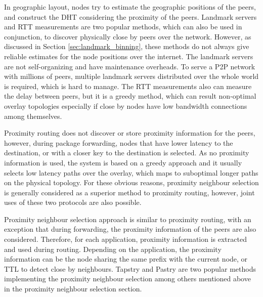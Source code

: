 In geographic layout, nodes try to estimate the geographic positions of the
peers, and construct the DHT considering the proximity of the peers. Landmark
servers and RTT measurements are two popular methods, which can also be used in
conjunction, to discover physically close by peers over the network. However, as
discussed in Section \ref{sec:landmark_binning}, these methods do not always
give reliable estimates for the node positions over the internet. The landmark
servers are not self-organizing and have maintenance overheads. To serve a
P2P network with millions of peers, multiple landmark servers
distributed over the whole world is required, which is hard to manage. The RTT
measurements also can measure the delay between peers, but it is a greedy method,
which can result non-optimal overlay topologies especially if close by nodes
have low bandwidth connections among themselves.

Proximity routing does not discover or store proximity information for the
peers, however, during package forwarding, nodes that have lower latency to the
destination, or with a closer key to the destination is selected. As no
proximity information is used, the system is based on a greedy approach and it
usually selects low latency paths over the overlay, which maps to suboptimal
longer paths on the physical topology. For these obvious reasons, proximity
neighbour selection is generally considered as a superior method to proximity
routing, however, joint uses of these two protocols are also possible.

Proximity neighbour selection approach is similar to proximity routing, with an
exception that during forwarding, the proximity information of the peers are
also considered. Therefore, for each application, proximity information is
extracted and used during routing. Depending on the application, the proximity
information can be the node sharing the same prefix with the current node, or
TTL to detect close by neighbours. Tapstry and Pastry are two popular methods
implementing the proximity neighbour selection among others mentioned above in the
proximity neighbour selection section.